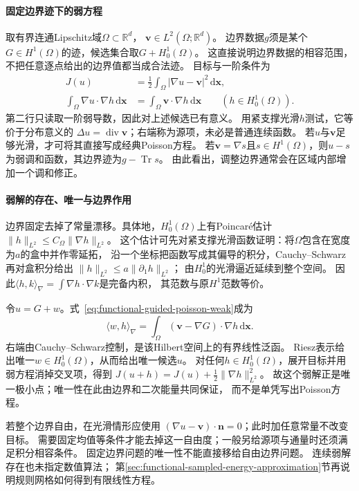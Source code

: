 \paragraph{固定边界迹下的弱方程}
取有界连通Lipschitz域$\Omega\subset\mathbb R^d$，
$\bm v\in L^2(\Omega;\mathbb R^d)$。
边界数据$g$须是某个$G\in H^1(\Omega)$的迹，候选集合取$G+H_0^1(\Omega)$。
这直接说明边界数据的相容范围，不把任意逐点给出的边界值都当成合法迹。
目标与一阶条件为
\begin{equation}
 \begin{aligned}
 J(u)&=\frac12\int_\Omega|\nabla u-\bm v|^2\,\mathrm d\bm x,\\
 \int_\Omega\nabla u\cdot\nabla h\,\mathrm d\bm x
 &=\int_\Omega\bm v\cdot\nabla h\,\mathrm d\bm x
 \qquad(h\in H_0^1(\Omega)).
 \end{aligned}
 \label{eq:functional-guided-poisson-weak}
\end{equation}
第二行只读取一阶弱导数，因此对上述候选已有意义。
用紧支撑光滑$h$测试，它等价于分布意义的
$\Delta u=\operatorname{div}\bm v$；右端称为源项，未必是普通连续函数。
若$u$与$\bm v$足够光滑，才可将其直接写成经典Poisson方程。
若$\bm v=\nabla s$且$s\in H^1(\Omega)$，则$u-s$为弱调和函数，其边界迹为$g-\operatorname{Tr}s$。
由此看出，调整边界通常会在区域内部增加一个调和修正。

\paragraph{弱解的存在、唯一与边界作用}
边界固定去掉了常量漂移。具体地，$H_0^1(\Omega)$上有Poincaré估计
$\lVert h\rVert_{L^2}\leq C_\Omega\lVert\nabla h\rVert_{L^2}$。
这个估计可先对紧支撑光滑函数证明：将$\Omega$包含在宽度为$a$的盒中并作零延拓，
沿一个坐标把函数写成其偏导的积分，Cauchy--Schwarz再对盒积分给出
$\lVert h\rVert_{L^2}\leq a\lVert\partial_1h\rVert_{L^2}$；
由$H_0^1$的光滑逼近延续到整个空间。
因此$\langle h,k\rangle_\nabla=\int\nabla h\cdot\nabla k$是完备内积，
其范数与原$H^1$范数等价。

令$u=G+w$。式~\eqref{eq:functional-guided-poisson-weak}成为
\[
 \langle w,h\rangle_\nabla
 =\int_\Omega(\bm v-\nabla G)\cdot\nabla h\,\mathrm d\bm x.
\]
右端由Cauchy--Schwarz控制，是该Hilbert空间上的有界线性泛函。
Riesz表示给出唯一$w\in H_0^1(\Omega)$，从而给出唯一候选$u$。
对任何$h\in H_0^1(\Omega)$，展开目标并用弱方程消掉交叉项，得到
$J(u+h)=J(u)+\tfrac12\lVert\nabla h\rVert_{L^2}^2$。
故这个弱解正是唯一极小点；唯一性在此由边界和二次能量共同保证，
而不是单凭写出Poisson方程。

若整个边界自由，在光滑情形应使用
$(\nabla u-\bm v)\cdot\bm n=0$；此时加任意常量不改变目标。
需要固定均值等条件才能去掉这一自由度；一般另给源项与通量时还须满足积分相容条件。
固定边界问题的唯一性不能直接移给自由边界问题。
连续弱解存在也未指定数值算法；
第\ref{sec:functional-sampled-energy-approximation}节再说明规则网格如何得到有限线性方程。

